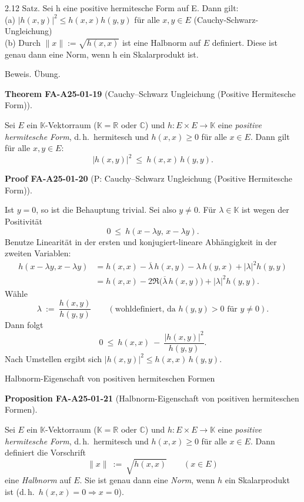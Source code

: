 \documentclass[10pt, letterpaper]{article}
\newcommand{\CustomHeading}[3]{%
  \par\medskip\noindent%
  \textbf{#1 #2} \textnormal{(#3)}.\enskip%
}
\newenvironment{PROP}[2]{\begin{unitbox}\CustomHeading{Proposition}{#1}{#2}}{\end{unitbox}}
\newenvironment{THEO}[2]{\begin{unitbox}\CustomHeading{Theorem}{#1}{#2}}{\end{unitbox}}
\newenvironment{PROOF}[2]{\begin{unitbox}\CustomHeading{Proof}{#1}{#2}}{\end{unitbox}}
\begin{document}
2.12 Satz. Sei h eine positive hermitesche Form auf E. Dann gilt:\\
(a) $|h(x, y)|^{2} \leq h(x, x) h(y, y)$ für alle $x, y \in E$ (Cauchy-Schwarz-Ungleichung)\\
(b) Durch $\|x\|:=\sqrt{h(x, x)}$ ist eine Halbnorm auf $E$ definiert. Diese ist genau dann eine Norm, wenn h ein Skalarprodukt ist.

Beweis. Übung.



\begin{THEO}{FA-A25-01-19}{Cauchy--Schwarz Ungleichung (Positive Hermitesche Form)}
Sei $E$ ein $\mathbb{K}$-Vektorraum ($\mathbb{K}=\mathbb{R}$ oder $\mathbb{C}$) und $h:E\times E\to\mathbb{K}$ eine \emph{positive hermitesche Form}, d.\,h.\ hermitesch und $h(x,x)\ge 0$ für alle $x\in E$. Dann gilt für alle $x,y\in E$:
\[
|h(x,y)|^{2}\ \le\ h(x,x)\,h(y,y).
\]
\end{THEO}

\begin{PROOF}{FA-A25-01-20}{P: Cauchy--Schwarz Ungleichung (Positive Hermitesche Form)}
Ist $y=0$, so ist die Behauptung trivial. Sei also $y\neq 0$. Für $\lambda\in\mathbb{K}$ ist wegen der Positivität
\[
0\ \le\ h(x-\lambda y,\,x-\lambda y).
\]
Benutze Linearität in der ersten und konjugiert-lineare Abhängigkeit in der zweiten Variablen:
\[
\begin{aligned}
h(x-\lambda y,x-\lambda y)
&= h(x,x) - \overline{\lambda}\,h(x,y) - \lambda\,h(y,x) + |\lambda|^{2} h(y,y)\\
&= h(x,x) - 2\Re\big(\overline{\lambda}\,h(x,y)\big) + |\lambda|^{2}h(y,y).
\end{aligned}
\]
Wähle
\[
\lambda\ :=\ \frac{h(x,y)}{h(y,y)}\qquad(\text{wohldefiniert, da }h(y,y)>0 \text{ für } y\neq 0).
\]
Dann folgt
\[
0\ \le\ h(x,x)\ -\ \frac{|h(x,y)|^{2}}{h(y,y)}.
\]
Nach Umstellen ergibt sich $|h(x,y)|^{2}\le h(x,x)\,h(y,y)$.
\end{PROOF}


Halbnorm-Eigenschaft von positiven hermiteschen Formen

\begin{PROP}{FA-A25-01-21}{Halbnorm-Eigenschaft von positiven hermiteschen Formen}
Sei $E$ ein $\mathbb{K}$-Vektorraum ($\mathbb{K}=\mathbb{R}$ oder $\mathbb{C}$) und $h:E\times E\to\mathbb{K}$ eine \emph{positive hermitesche Form}, d.\,h.\ hermitesch und $h(x,x)\ge 0$ für alle $x\in E$. Dann definiert die Vorschrift
\[
\|x\|\ :=\ \sqrt{h(x,x)}\qquad(x\in E)
\]
eine \emph{Halbnorm} auf $E$. Sie ist genau dann eine \emph{Norm}, wenn $h$ ein Skalarprodukt ist (d.\,h.\ $h(x,x)=0\Rightarrow x=0$).
\end{PROP}
\end{document}
